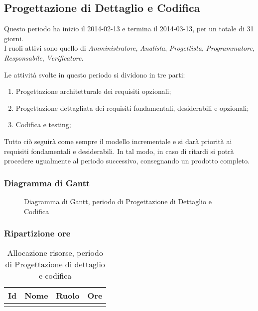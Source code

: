 	\subsection{Progettazione di Dettaglio e Codifica}
	 
Questo periodo ha inizio il 2014-02-13 e termina il 2014-03-13, per un totale di 31 giorni. \\
I ruoli attivi sono quello di \textit{Amministratore}, \textit{Analista}, \textit{Progettista}, \textit{Programmatore}, \textit{Responsabile}, \textit{Verificatore}.

Le attività svolte in questo periodo si dividono in tre parti:

\begin{enumerate}

	\item Progettazione architetturale dei requisiti opzionali;
	\item Progettazione dettagliata dei requisiti fondamentali, desiderabili e opzionali;
	\item Codifica e testing;

\end{enumerate}

Tutto ciò seguirà come sempre il modello incrementale e si darà priorità ai requisiti fondamentali e desiderabili.
In tal modo, in caso di ritardi si potrà procedere ugualmente al periodo successivo, consegnando un prodotto completo.

\subsubsection{Diagramma di Gantt}

\begin{figure}[H]
\centering
\scalebox{0.63}{%

	

}
\caption{Diagramma di Gantt, periodo di Progettazione di Dettaglio e Codifica}
\end{figure}

\subsubsection{Ripartizione ore}

\begin{center}
\begin{longtable}{ l l l c  }
	\hline
	\multicolumn{1}{c}{\textbf{Id}} & 
	\multicolumn{1}{c}{\textbf{Nome}} & 
	\multicolumn{1}{c}{\textbf{Ruolo}}& 
	\multicolumn{1}{c}{\textbf{Ore}} \\
	\hline
	
		
	
	\caption{Allocazione risorse, periodo di Progettazione di dettaglio e codifica}
\end{longtable}	
\end{center}
	
